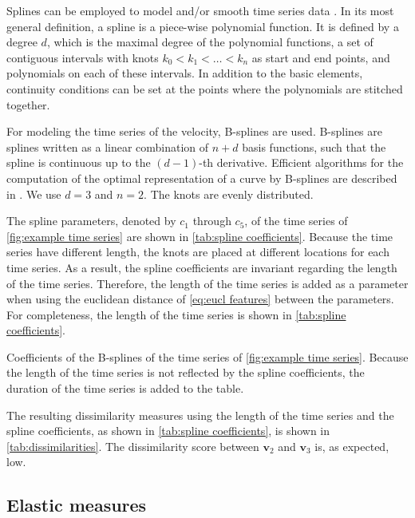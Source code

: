 \documentclass[10pt,final,a4paper,oneside,onecolumn]{article}
\newcommand{\profile}[1]{\textbf{v}_{#1}}
\theoremstyle{plain}\newtheorem{definition}{Definition}[section]    %
\theoremstyle{definition}\newtheorem{example}{Example}[section]     %
\theoremstyle{remark}\newtheorem{remarkenv}{Remark}[section]        %
\begin{document}
Splines can be employed to model and/or smooth time series data \cite{dierckx1993splines, deboor1978practical}. In its most general definition, a spline is a piece-wise polynomial function. It is defined by a degree $d$, which is the maximal degree of the polynomial functions, a set of contiguous intervals with knots $k_0 < k_1 < \ldots < k_n$ as start and end points, and polynomials on each of these intervals. In addition to the basic elements, continuity conditions can be set at the points where the polynomials are stitched together. 

For modeling the time series of the velocity, B-splines are used. B-splines are splines written as a linear combination of $n+d$ basis functions, such that the spline is continuous up to the $(d-1)$-th derivative. Efficient algorithms for the computation of the optimal representation of a curve by B-splines are described in \cite{dierckx1993splines}. We use $d=3$ and $n=2$. The knots are evenly distributed.

The spline parameters, denoted by $c_1$ through $c_5$, of the time series of \cref{fig:example time series} are shown in \cref{tab:spline coefficients}. Because the time series have different length, the knots are placed at different locations for each time series. As a result, the spline coefficients are invariant regarding the length of the time series. Therefore, the length of the time series is added as a parameter when using the euclidean distance of \cref{eq:eucl features} between the parameters. For completeness, the length of the time series is shown in \cref{tab:spline coefficients}. 


\begin{table}
	\centering
	\caption{Coefficients of the B-splines of the time series of \cref{fig:example time series}. Because the length of the time series is not reflected by the spline coefficients, the duration of the time series is added to the table.}
	\label{tab:spline coefficients}
	
\end{table}

The resulting dissimilarity measures using the length of the time series and the spline coefficients, as shown in \cref{tab:spline coefficients}, is shown in \cref{tab:dissimilarities}. The dissimilarity score between $\profile{2}$ and $\profile{3}$ is, as expected, low.


\subsection{Elastic measures}
\end{document}
